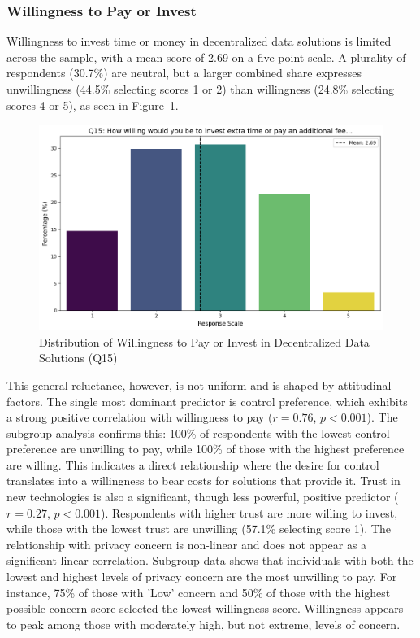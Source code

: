 	\subsubsection{Willingness to Pay or Invest}
	Willingness to invest time or money in decentralized data solutions is limited across the sample, with a mean score of 2.69 on a five-point scale. A plurality of respondents (30.7\%) are neutral, but a larger combined share expresses unwillingness (44.5\% selecting scores 1 or 2) than willingness (24.8\% selecting scores 4 or 5), as seen in Figure~\ref{fig:WTP_distribution}. 
	\begin{figure}[ht]\centering
		\includegraphics[width=1\linewidth]{figures/questions/Q15_likert.png}
		\caption{Distribution of Willingness to Pay or Invest in Decentralized Data Solutions (Q15)}
		\label{fig:WTP_distribution}
	\end{figure}
	This general reluctance, however, is not uniform and is shaped by attitudinal factors.
	The single most dominant predictor is control preference, which exhibits a strong positive correlation with willingness to pay ($r = 0.76$, $p < 0.001$). The subgroup analysis confirms this: 100\% of respondents with the lowest control preference are unwilling to pay, while 100\% of those with the highest preference are willing. This indicates a direct relationship where the desire for control translates into a willingness to bear costs for solutions that provide it.
	Trust in new technologies is also a significant, though less powerful, positive predictor ($r = 0.27$, $p < 0.001$). Respondents with higher trust are more willing to invest, while those with the lowest trust are unwilling (57.1\% selecting score 1).
	The relationship with privacy concern is non-linear and does not appear as a significant linear correlation. Subgroup data shows that individuals with both the lowest and highest levels of privacy concern are the most unwilling to pay. For instance, 75\% of those with 'Low' concern and 50\% of those with the highest possible concern score selected the lowest willingness score. Willingness appears to peak among those with moderately high, but not extreme, levels of concern.
